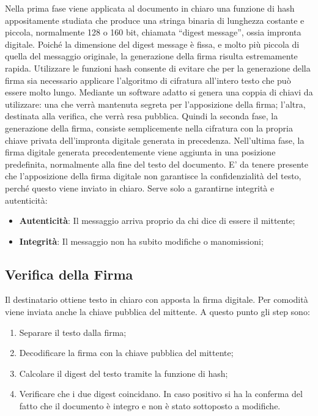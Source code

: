 Nella prima fase viene applicata al documento in
chiaro una funzione di hash appositamente
studiata che produce una stringa binaria di
lunghezza costante e piccola, normalmente 128 o 160
bit, chiamata “digest message”, ossia impronta
digitale.
Poiché la dimensione del digest message è fissa,
e molto più piccola di quella del messaggio
originale, la generazione della firma risulta
estremamente rapida. Utilizzare le funzioni hash
consente di evitare che per la generazione della
firma sia necessario applicare l'algoritmo di
cifratura all'intero testo che può essere molto lungo.
Mediante un software adatto si genera una coppia di
chiavi da utilizzare: una che verrà mantenuta
segreta per l'apposizione della firma; l'altra, destinata alla verifica, che
verrà resa pubblica. Quindi
la seconda fase, la generazione della firma, consiste semplicemente nella
cifratura con la propria
chiave privata dell'impronta digitale generata in precedenza.
Nell'ultima fase, la firma digitale generata precedentemente viene aggiunta in
una posizione
predefinita, normalmente alla fine del testo del documento.
E' da tenere presente che l'apposizione della firma digitale non garantisce la
confidenzialità del
testo, perché questo viene inviato in chiaro. Serve solo a garantirne integrità
e autenticità:

\begin{itemize}
    \item \textbf{Autenticità}: Il messaggio arriva proprio da chi dice di essere il mittente;
    \item \textbf{Integrità}: Il messaggio non ha subito modifiche o manomissioni;
\end{itemize}

\subsection{Verifica della Firma}

Il destinatario ottiene testo in chiaro con apposta la firma digitale.
Per comodità viene inviata anche la chiave pubblica del mittente. A
questo punto gli step sono:

\begin{enumerate}
    \item Separare il testo dalla firma;
    \item Decodificare la firma con la chiave pubblica del mittente;
    \item Calcolare il digest del testo tramite la funzione di hash;
    \item Verificare che i due digest coincidano. In caso positivo si ha
          la conferma del fatto che il documento è integro e non è stato
          sottoposto a modifiche.
\end{enumerate}

